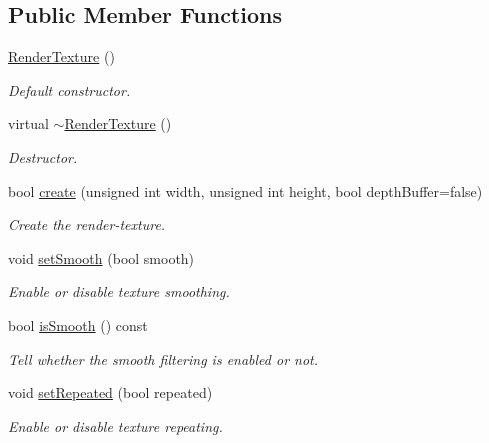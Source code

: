 \subsection*{Public Member Functions}
\begin{DoxyCompactItemize}
\item 
\hyperlink{classsf_1_1_render_texture_a19ee6e5b4c40ad251803389b3953a9c6}{Render\+Texture} ()
\begin{DoxyCompactList}\small\item\em Default constructor. \end{DoxyCompactList}\item 
\mbox{\label{classsf_1_1_render_texture_a94b84ab9335be84d2a014c964d973304}} 
virtual \hyperlink{classsf_1_1_render_texture_a94b84ab9335be84d2a014c964d973304}{$\sim$\+Render\+Texture} ()
\begin{DoxyCompactList}\small\item\em Destructor. \end{DoxyCompactList}\item 
bool \hyperlink{classsf_1_1_render_texture_aefbb76eb3b87e368ab974b2660931ccb}{create} (unsigned int width, unsigned int height, bool depth\+Buffer=false)
\begin{DoxyCompactList}\small\item\em Create the render-\/texture. \end{DoxyCompactList}\item 
void \hyperlink{classsf_1_1_render_texture_af08991e63c6020865dd07b20e27305b6}{set\+Smooth} (bool smooth)
\begin{DoxyCompactList}\small\item\em Enable or disable texture smoothing. \end{DoxyCompactList}\item 
bool \hyperlink{classsf_1_1_render_texture_a5b43c007ab6643accc5dae84b5bc8f61}{is\+Smooth} () const
\begin{DoxyCompactList}\small\item\em Tell whether the smooth filtering is enabled or not. \end{DoxyCompactList}\item 
void \hyperlink{classsf_1_1_render_texture_af8f97b33512bf7d5b6be3da6f65f7365}{set\+Repeated} (bool repeated)
\begin{DoxyCompactList}\small\item\em Enable or disable texture repeating. \end{DoxyCompactList}\item 

\end{DoxyCompactItemize}
